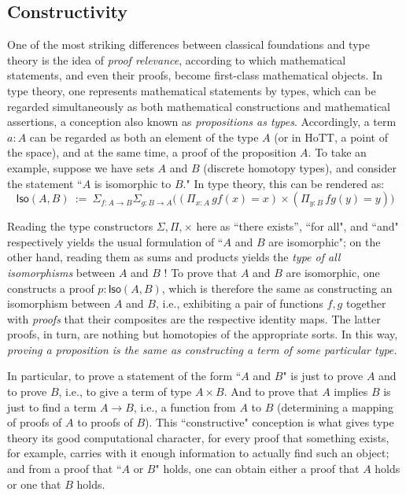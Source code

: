 {%


\subsection*{Constructivity} 


One of the most striking differences between classical foundations and type theory is the idea of \emph{proof relevance}, according to which mathematical statements, and even their proofs, become first-class mathematical objects.  In type theory, one represents mathematical statements by types, which can be regarded simultaneously as both mathematical constructions and mathematical assertions, a conception also known as \emph{propositions as types}.  Accordingly, a term $a : A$ can be regarded as both an element of the type $A$ (or in HoTT, a point of the space), and at the same time, a proof of the proposition $A$.  To take an example, suppose we have sets $A$ and $B$ (discrete homotopy types), and consider the statement ``$A$ is isomorphic to $B$."  In type theory, this can be rendered as:
\[
\mathsf{Iso}(A,B)\ :=\ \Sigma_{f : A\to B}\Sigma_{g : B\to A}\big((\Pi_{x:A}\, gf(x) = x) \times (\Pi_{y:B}\, fg(y) = y)\big)
\]

Reading the type constructors $\Sigma, \Pi, \times$  here  as ``there exists'', ``for all", and ``and" respectively yields the usual formulation of ``$A$ and $B$ are isomorphic"; on the other hand, reading them as sums and products yields the \emph{type of all isomorphisms} between $A$ and $B$ !  To prove that $A$ and $B$ are isomorphic, one  constructs a proof $p : \mathsf{Iso}(A,B)$, which is therefore the same  as constructing an isomorphism between $A$ and $B$, i.e., exhibiting a pair of functions $f, g$ together with \emph{proofs} that their composites are the respective identity maps.  The latter proofs, in turn, are nothing but homotopies of the appropriate sorts.  In this way, \emph{proving a proposition is the same as constructing a term of some particular type.}

In particular, to prove a statement of the form ``$A$ and $B$" is just to prove $A$ and to prove $B$, i.e., to give a term of type $A\times B$.  And to prove that $A$ implies $B$ is just to find a term $A\to B$, i.e., a function from $A$ to $B$ (determining a mapping of proofs of $A$ to proofs of $B$).  This ``constructive" conception is what gives type theory its good computational character, for every proof that something exists, for example, carries with it enough information to actually find such an object; and from a proof that  ``$A$ or $B$" holds, one can obtain either a proof that $A$ holds or one that $B$ holds.  

}
